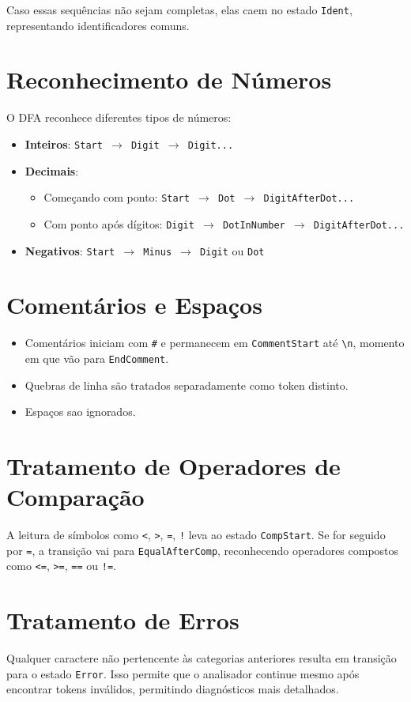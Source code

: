 \documentclass[a4paper,12pt]{article}
\begin{document}
Caso essas sequências não sejam completas, elas caem no estado \texttt{Ident}, representando identificadores comuns.

\section*{Reconhecimento de Números}

O DFA reconhece diferentes tipos de números:

\begin{itemize}
    \item \textbf{Inteiros}: \texttt{Start $\rightarrow$ Digit $\rightarrow$ Digit...}
    \item \textbf{Decimais}:
        \begin{itemize}
            \item Começando com ponto: \texttt{Start $\rightarrow$ Dot $\rightarrow$ DigitAfterDot...}
            \item Com ponto após dígitos: \texttt{Digit $\rightarrow$ DotInNumber $\rightarrow$ DigitAfterDot...}
        \end{itemize}
    \item \textbf{Negativos}: \texttt{Start $\rightarrow$ Minus $\rightarrow$ Digit} ou \texttt{Dot}
\end{itemize}

\section*{Comentários e Espaços}

\begin{itemize}
    \item Comentários iniciam com \texttt{\#} e permanecem em \texttt{CommentStart} até \texttt{\textbackslash n}, momento em que vão para \texttt{EndComment}.
    \item Quebras de linha são tratados separadamente como token distinto.
    \item Espaços sao ignorados.
\end{itemize}

\section*{Tratamento de Operadores de Comparação}

A leitura de símbolos como \texttt{<}, \texttt{>}, \texttt{=}, \texttt{!} leva ao estado \texttt{CompStart}. Se for seguido por \texttt{=}, a transição vai para \texttt{EqualAfterComp}, reconhecendo operadores compostos como \texttt{<=}, \texttt{>=}, \texttt{==} ou \texttt{!=}.

\section*{Tratamento de Erros}

Qualquer caractere não pertencente às categorias anteriores resulta em transição para o estado \texttt{Error}. Isso permite que o analisador continue mesmo após encontrar tokens inválidos, permitindo diagnósticos mais detalhados.
\end{document}

